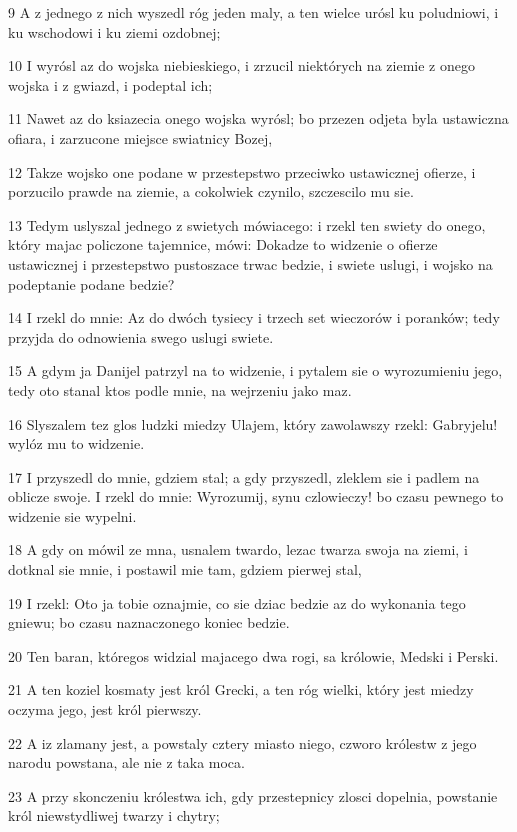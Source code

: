 \par 9 A z jednego z nich wyszedl róg jeden maly, a ten wielce urósl ku poludniowi, i ku wschodowi i ku ziemi ozdobnej;
\par 10 I wyrósl az do wojska niebieskiego, i zrzucil niektórych na ziemie z onego wojska i z gwiazd, i podeptal ich;
\par 11 Nawet az do ksiazecia onego wojska wyrósl; bo przezen odjeta byla ustawiczna ofiara, i zarzucone miejsce swiatnicy Bozej,
\par 12 Takze wojsko one podane w przestepstwo przeciwko ustawicznej ofierze, i porzucilo prawde na ziemie, a cokolwiek czynilo, szczescilo mu sie.
\par 13 Tedym uslyszal jednego z swietych mówiacego: i rzekl ten swiety do onego, który majac policzone tajemnice, mówi: Dokadze to widzenie o ofierze ustawicznej i przestepstwo pustoszace trwac bedzie, i swiete uslugi, i wojsko na podeptanie podane bedzie?
\par 14 I rzekl do mnie: Az do dwóch tysiecy i trzech set wieczorów i poranków; tedy przyjda do odnowienia swego uslugi swiete.
\par 15 A gdym ja Danijel patrzyl na to widzenie, i pytalem sie o wyrozumieniu jego, tedy oto stanal ktos podle mnie, na wejrzeniu jako maz.
\par 16 Slyszalem tez glos ludzki miedzy Ulajem, który zawolawszy rzekl: Gabryjelu! wylóz mu to widzenie.
\par 17 I przyszedl do mnie, gdziem stal; a gdy przyszedl, zleklem sie i padlem na oblicze swoje. I rzekl do mnie: Wyrozumij, synu czlowieczy! bo czasu pewnego to widzenie sie wypelni.
\par 18 A gdy on mówil ze mna, usnalem twardo, lezac twarza swoja na ziemi, i dotknal sie mnie, i postawil mie tam, gdziem pierwej stal,
\par 19 I rzekl: Oto ja tobie oznajmie, co sie dziac bedzie az do wykonania tego gniewu; bo czasu naznaczonego koniec bedzie.
\par 20 Ten baran, któregos widzial majacego dwa rogi, sa królowie, Medski i Perski.
\par 21 A ten koziel kosmaty jest król Grecki, a ten róg wielki, który jest miedzy oczyma jego, jest król pierwszy.
\par 22 A iz zlamany jest, a powstaly cztery miasto niego, czworo królestw z jego narodu powstana, ale nie z taka moca.
\par 23 A przy skonczeniu królestwa ich, gdy przestepnicy zlosci dopelnia, powstanie król niewstydliwej twarzy i chytry;
